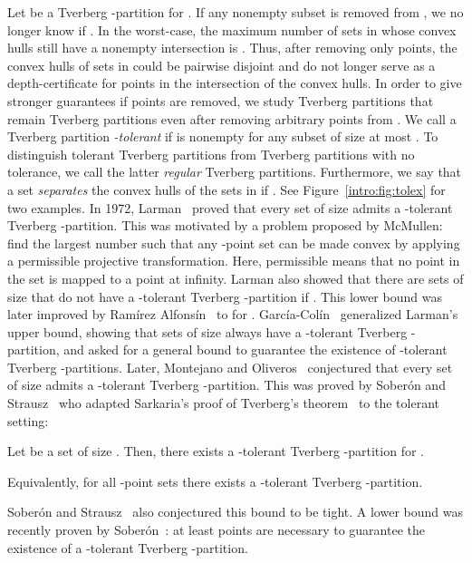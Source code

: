 \documentclass[oribibl,envcountsame,envcountsect]{llncs}
\newcommand{\Soberon}{Sober\'{o}n}
\newcommand{\GarciaColin}{Garc\'{i}a-Col\'{i}n}
\begin{document}
Let  be a Tverberg -partition for . If any nonempty subset
 is removed from , we no longer know if . In the worst-case, the maximum number of
sets in  whose convex hulls still have a nonempty intersection is
. Thus, after removing only  points, the convex hulls of sets in 
could be pairwise disjoint and do not longer serve as a depth-certificate for
points in the intersection of the convex hulls. In order to give stronger
guarantees if
points are removed, we study Tverberg
partitions that remain Tverberg partitions even after removing  arbitrary
points from . We call a Tverberg partition \emph{-tolerant}
if  is nonempty for any subset  of size at most . To distinguish tolerant Tverberg partitions from
Tverberg partitions with no tolerance, we  call the latter \emph{regular}
Tverberg partitions. Furthermore, we say that a set  \emph{separates} the convex hulls of the
sets in  if . See
Figure~\ref{intro:fig:tolex} for two examples.
In 1972, Larman~\cite{Larman1972} proved that
every set of size  admits a -tolerant Tverberg
-partition.  This was motivated by a problem proposed by
McMullen: find the largest number  such that any -point set
can be made convex by applying a permissible projective
transformation. Here, permissible means
that no point in the set is mapped to a point at infinity.
Larman also showed that there are sets of size 
that do not have a -tolerant Tverberg
-partition if . This lower bound was later improved by
Ram\'irez Alfons\'in~\cite{Alfonsin2001} to
 for . \GarciaColin{}~\cite{GarciaColin2007} generalized
Larman's upper bound, showing that sets of size  always have a
-tolerant Tverberg -partition, and asked for a general bound to guarantee the
existence of -tolerant Tverberg -partitions. Later, Montejano and
Oliveros~\cite{Montejano2011} conjectured that every set of size  admits a
-tolerant Tverberg -partition. This
was proved by \Soberon{} and Strausz~\cite{Soberon2012} who adapted Sarkaria's
proof of Tverberg's theorem~\cite{Sarkaria1992} to the tolerant setting:

\begin{theorem}[\Soberon{}-Strausz-Theorem~\cite{Soberon2012}]\label{thm:sobstrau}
  Let  be a set of size . Then, there exists
  a -tolerant Tverberg -partition for .

  Equivalently, for all -point sets there
  exists a -tolerant Tverberg -partition.
\end{theorem}

\Soberon{} and Strausz~\cite{Soberon2012} also
conjectured this bound to be tight. A lower bound was recently
proven by \Soberon{}~\cite{Soberon2014}: at least
 points are necessary to guarantee the
existence of a -tolerant Tverberg -partition.
\end{document}
